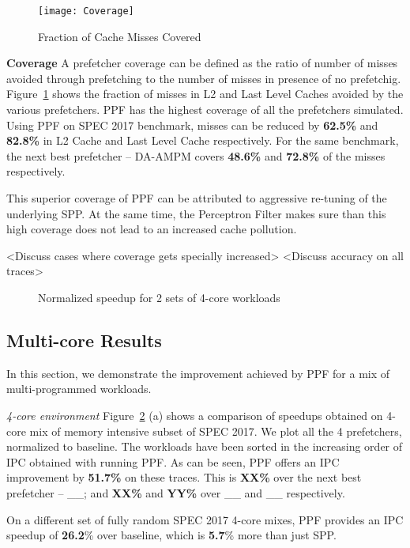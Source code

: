 \begin{figure}[h]
\texttt{[image: Coverage]}
\caption{Fraction of Cache Misses Covered}
\label{Fig:Coverage}
\end{figure}

\textbf{Coverage}\newline
A prefetcher coverage can be defined as the ratio of number of misses 
avoided through prefetching to the number of misses in presence of no 
prefetchig.
Figure~\ref{Fig:Coverage} shows the fraction of misses in L2 and Last
Level Caches avoided by the various prefetchers.
PPF has the highest coverage of all the prefetchers simulated. Using PPF 
on SPEC 2017 benchmark, 
misses can be reduced by \textbf{62.5\%} and \textbf{82.8\%} in L2 Cache and Last Level 
Cache respectively. For the same benchmark, the next best prefetcher -- 
DA-AMPM covers \textbf{48.6\%} and \textbf{72.8\%} of the misses respectively.

This superior coverage of PPF can be attributed to aggressive 
re-tuning of the underlying SPP. At the same time, the Perceptron Filter
makes sure than this high coverage does not lead to an increased 
cache pollution. 

<Discuss cases where coverage gets specially increased>
<Discuss accuracy on all traces>

\begin{figure}[h]
\caption{Normalized speedup for 2 sets of 4-core workloads}
\label{Fig:4Core_SPEC2017}
\end{figure}


\subsection{Multi-core Results}
\label{Results-Multi}
In this section, we demonstrate the improvement achieved by PPF
for a mix of multi-programmed workloads.

\textit{4-core environment} Figure~\ref{Fig:4Core_SPEC2017} (a) 
shows a comparison of speedups
obtained on 4-core mix of memory intensive subset of SPEC 2017.  We
plot all the 4 prefetchers, normalized to baseline.  The workloads
have been sorted in the increasing order of IPC obtained with running PPF.
As can be seen,
PPF offers an IPC improvement by \textbf{51.7\%} on these traces.  This is
\textbf{XX\%} over the next best prefetcher -- \_\_; and \textbf{XX\%} 
and \textbf{YY\%} over \_\_ and \_\_ respectively.

On a different set of fully random SPEC 2017 4-core mixes, 
PPF provides an IPC speedup of 
\textbf{26.2}\% over baseline, which is \textbf{5.7}\% more than just SPP.


